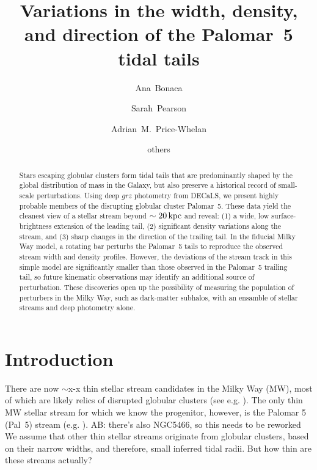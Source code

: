 \documentclass[twocolumn]{aastex62}
\newcommand{\ab}[1]{{\color{red} AB: #1}}
\begin{document}
\sloppy\sloppypar\raggedbottom\frenchspacing %

\title{Variations in the width, density, and direction of the Palomar~5 tidal tails}

\author[0000-0002-7846-9787]{Ana~Bonaca}

\author{Sarah~Pearson}

\author[0000-0003-0872-7098]{Adrian~M.~Price-Whelan}

\author{others}

\begin{abstract}\noindent %
Stars escaping globular clusters form tidal tails that are predominantly shaped by the global distribution of mass in the Galaxy, but also preserve a historical record of small-scale perturbations.
Using deep $grz$ photometry from DECaLS, we present highly probable members of the disrupting globular cluster Palomar~5.
These data yield the cleanest view of a stellar stream beyond $\sim20\,\rm kpc$ and reveal: (1) a wide, low surface-brightness extension of the leading tail, (2) significant density variations along the stream, and (3) sharp changes in the direction of the trailing tail.
In the fiducial Milky Way model, a rotating bar perturbs the Palomar~5 tails to reproduce the observed stream width and density profiles.
However, the deviations of the stream track in this simple model are significantly smaller than those observed in the Palomar~5 trailing tail, so future kinematic observations may identify an additional source of perturbation.
These discoveries open up the possibility of measuring the population of perturbers in the Milky Way, such as dark-matter subhalos, with an ensamble of stellar streams and deep photometry alone.
\end{abstract}


\section{Introduction}
\label{sec:intro}
There are now $\sim$x-x thin stellar stream candidates in the Milky Way (MW), most of which are likely relics of disrupted globular clusters (see e.g. \citealt{Ibata:2019}).
The only thin MW stellar stream for which we know the progenitor, however, is the Palomar 5 (Pal~5) stream (e.g. \citealt{Odenkirchen:2001}). \ab{there's also NGC5466, so this needs to be reworked}
We assume that other thin stellar streams originate from globular clusters, based on their narrow widths, and therefore, small inferred tidal radii. But how thin are these streams actually? 
\end{document}
